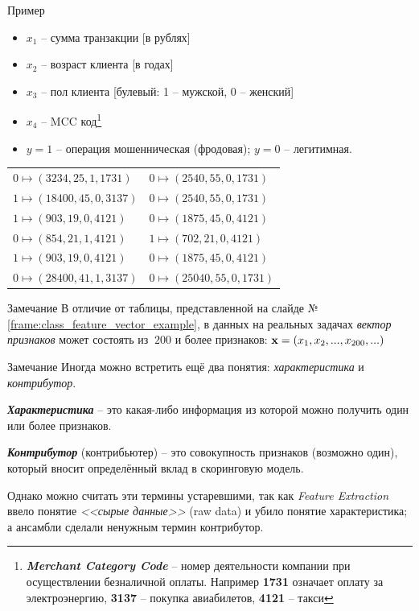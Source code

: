 \documentclass{beamer}
\newcommand{\termdef}[1]{\textbf{\textit{#1}}}
\newcommand{\term}{\textit}
\begin{document}
  \begin{frame}{Пример}\label{frame:class_feature_vector_example}
  \begin{itemize}
  	 \item $x_1$ -- сумма транзакции [в рублях]
  	 \item $x_2$ -- возраст клиента [в годах]
  	 \item $x_3$ -- пол клиента [булевый: 1 -- мужской, 0 -- женский]
  	 \item $x_4$ -- MCC код\footnote{\termdef{Merchant Category Code} -- номер деятельности компании при осуществлении безналичной оплаты. Например \textbf{1731} означает оплату за электроэнергию, \textbf{3137} -- покупка авиабилетов, \textbf{4121} -- такси}
  	 \item  $y=1$ -- операция мошенническая (фродовая);  $y=0$ -- легитимная.
  \end{itemize}
  \begin{center}\small \begin{tabular}{ l l }
  	$0 \mapsto (3234, 25, 1, 1731) $ &  $0 \mapsto (2540, 55, 0, 1731)$ \\
  	$1 \mapsto (18400, 45, 0, 3137)$ & $0 \mapsto (2540, 55, 0, 1731)$  \\
  	$1 \mapsto (903, 19, 0, 4121)$  & $0 \mapsto (1875, 45, 0, 4121)$  \\
  	$0 \mapsto (854, 21, 1, 4121)$  & $1 \mapsto (702, 21, 0, 4121)$  \\
  	$1 \mapsto (903, 19, 0, 4121)$  & $0 \mapsto (1875, 45, 0, 4121)$  \\
  	$0 \mapsto (28400, 41, 1, 3137)$ & $0 \mapsto (25040, 55, 0, 1731)$  \\
  \end{tabular}\end{center}
  \end{frame}
  
  \begin{frame}
   \begin{block}{Замечание}
	  В отличие от таблицы, представленной на слайде №\ref{frame:class_feature_vector_example},
	  в данных на реальных задачах \term{вектор признаков} может состоять из $~200$ и более признаков:
	  $\bold x = (x_1, x_2, ..., x_{200}, ...)$
  \end{block}
   \end{frame}

  \begin{frame}
\begin{block}{Замечание}
	Иногда можно встретить ещё два понятия: \term{характеристика} и \term{контрибутор}.
	
	\termdef{Характеристика} -- это какая-либо информация из которой можно получить один
	или более признаков.
	
	\termdef{Контрибутор} (контрибьютер) -- это совокупность признаков (возможно один),
	который вносит определённый вклад в скоринговую модель. 
	
	Однако можно считать эти термины устаревшими, так как
	\term{Feature Extraction} ввело понятие \term{<<сырые данные>>} (raw data)
	и убило понятие характеристика; 
	а ансамбли сделали ненужным термин контрибутор.
\end{block}
\end{frame}
\end{document}

